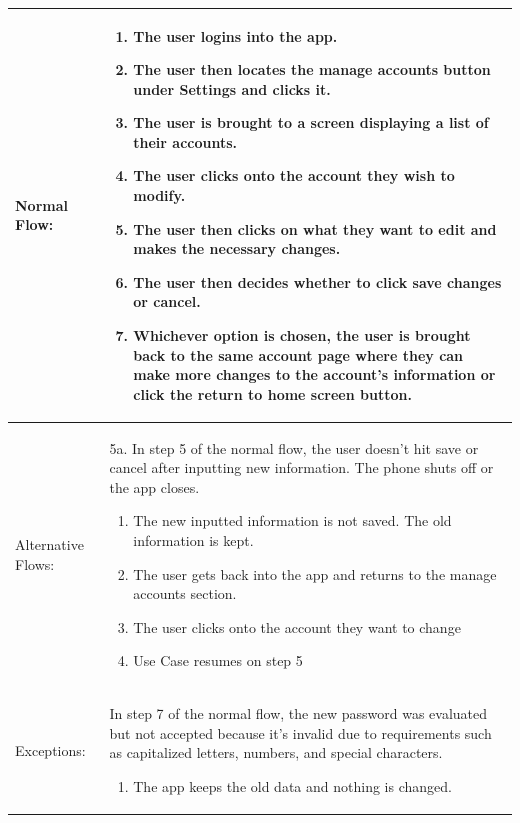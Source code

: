 \documentclass[stu]{apa7}
\newcommand{\nextitemblank}{\par\hspace*{\labelsep}\hspace*{\labelsep}}
\begin{document}
{\begin{xltabular}{\textwidth}{|l|X|}
              Normal Flow: & \begin{enumerate}
                               \item The user logins into the app.
                               \item The user then locates the manage accounts button under Settings and clicks it.
                               \item The user is brought to a screen displaying a list of their accounts.
                               \item The user clicks onto the account they wish to modify.
                               \item The user then clicks on what they want to edit and makes the necessary changes.
                               \item The user then decides whether to click save changes or cancel.
                               \item Whichever option is chosen, the user is brought back to the same account page where they can make more changes to the account’s information or click the return to home screen button.
                             \end{enumerate} \\ \hline

              Alternative Flows: & \nextitemblank 5a. In step 5 of the normal flow, the user doesn’t hit save or cancel after inputting new information. The phone shuts off or the app closes.
                                   \begin{enumerate}
                                     \item The new inputted information is not saved. The old information is kept.
                                     \item The user gets back into the app and returns to the manage accounts section.
                                     \item The user clicks onto the account they want to change
                                     \item Use Case resumes on step 5
                                   \end{enumerate} \\ \hline

              Exceptions: & \nextitemblank In step 7 of the normal flow, the new password was evaluated but not accepted because it’s invalid due to requirements such as capitalized letters, numbers, and special characters.
                            \begin{enumerate}
                              \item The app keeps the old data and nothing is changed.
                            \end{enumerate} \\ \hline


\end{xltabular}}
\end{document}
